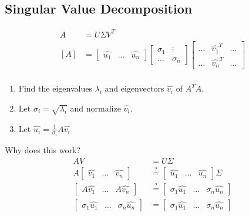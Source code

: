 \documentclass{math}
\begin{document}
\subsection*{Singular Value Decomposition}
\begin{align*}
  A &= U\Sigma V^T \\
  [A] &= \begin{bmatrix}\hat{u_1} & \dots & \hat{u_n}\end{bmatrix}
    \begin{bmatrix}
      \sigma_1 & \vdots \\
      \dots & \sigma_n
    \end{bmatrix}\begin{bmatrix}
      \dots & \hat{v_1}^T & \dots \\
      \dots & \hat{v_n}^T & \dots
    \end{bmatrix} \\
\end{align*}
\begin{enumerate}
  \item Find the eigenvalues \( \lambda_i \) and eigenvectors \( \hat{v_i} \)
    of \( A^TA \).
  \item Let \( \sigma_i = \sqrt{\lambda_i} \) and normalize \( \hat{v_i} \).
  \item Let \( \hat{u_i} = \frac{1}{\sigma_i}A\hat{v_i} \)
\end{enumerate}
Why does this work?
\begin{align*}
  AV &= U\Sigma \\
  A\begin{bmatrix}\hat{v_1} & \dots & \hat{v_n}\end{bmatrix} &\stackrel{?}{=}
    \begin{bmatrix}\hat{u_1} & \dots & \hat{u_n}\end{bmatrix}\Sigma \\
  \begin{bmatrix}A\hat{v_1} & \dots & A\hat{v_n}\end{bmatrix} &\stackrel{?}{=}
    \begin{bmatrix}\sigma_1\hat{u_1} & \dots & \sigma_n\hat{u_n}\end{bmatrix} \\
  \begin{bmatrix}
    \sigma_1\hat{u_1} & \dots & \sigma_n\hat{u_n}
  \end{bmatrix} &= \begin{bmatrix}
    \sigma_1\hat{u_1} & \dots & \sigma_n\hat{u_n}
  \end{bmatrix}
\end{align*}
\end{document}

